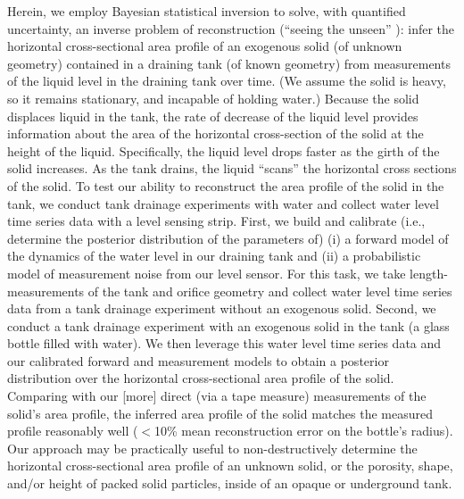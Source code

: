 \documentclass[a4paper,fleqn]{cas-dc}
\begin{document}
Herein, we employ Bayesian statistical inversion \cite{calvetti2018inverse,waqar2023tutorial,kaipio2006statistical,dashti2013bayesian} to solve, with quantified uncertainty, an inverse problem of reconstruction (``seeing the unseen'' \cite{uhlmann2014inverse}): infer the horizontal cross-sectional area profile of an exogenous solid (of unknown geometry) contained in a draining tank (of known geometry) from measurements of the liquid level in the draining tank over time. 
(We assume the solid is heavy, so it remains stationary, and incapable of holding water.)
Because the solid displaces liquid in the tank, the rate of decrease of the liquid level provides information about the area of the horizontal cross-section of the solid at the height of the liquid. Specifically, the liquid level drops faster as the girth of the solid increases. 
As the tank drains, the liquid ``scans'' the horizontal cross sections of the solid.
To test our ability to reconstruct the area profile of the solid in the tank, we conduct tank drainage experiments with water and collect water level time series data with a level sensing strip. 
First, we build and calibrate (i.e., determine the posterior distribution of the parameters of) (i) a forward model of the dynamics of the water level in our draining tank and (ii) a probabilistic model of measurement noise from our level sensor.
For this task, we take length-measurements of the tank and orifice geometry and collect water level time series data from a tank drainage experiment without an exogenous solid. 
Second, we conduct a tank drainage experiment with an exogenous solid in the tank (a glass bottle filled with water). We then leverage this water level time series data and our calibrated forward and measurement models to obtain a posterior distribution over the horizontal cross-sectional area profile of the solid.
Comparing with our [more] direct (via a tape measure) measurements of the solid's area profile, the inferred area profile of the solid matches the measured profile reasonably well ($<$10\% mean reconstruction error on the bottle's radius). Our approach may be practically useful to non-destructively determine the horizontal cross-sectional area profile of an unknown solid, or the porosity, shape, and/or height of packed solid particles, inside of an opaque or underground tank.

%
\end{document}

